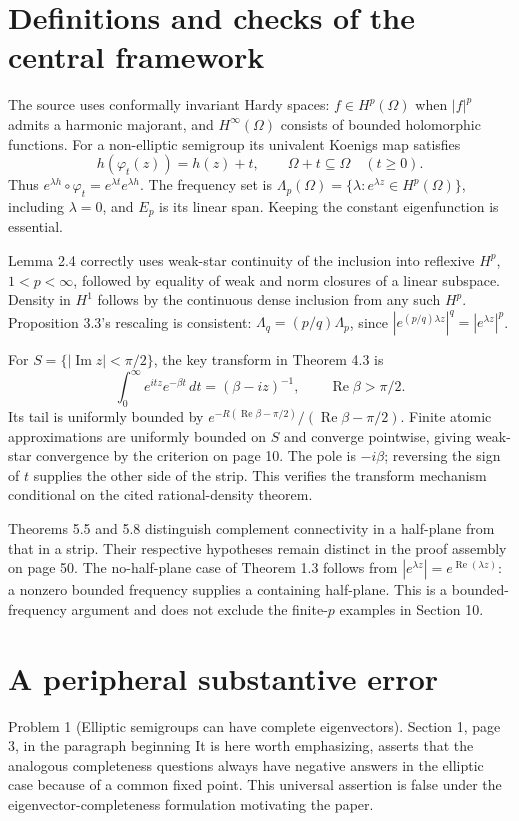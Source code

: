 \documentclass[10pt]{article}
\begin{document}
\section*{Definitions and checks of the central framework}
The source uses conformally invariant Hardy spaces: \(f\in H^p(\Omega)\) when \(|f|^p\) admits a harmonic majorant, and \(H^\infty(\Omega)\) consists of bounded holomorphic functions. For a non-elliptic semigroup its univalent Koenigs map satisfies \[h(\varphi_t(z))=h(z)+t,\qquad \Omega+t\subseteq\Omega\quad(t\geq0).\] Thus \(e^{\lambda h}\circ\varphi_t=e^{\lambda t}e^{\lambda h}\). The frequency set is \(\Lambda_p(\Omega)=\{\lambda:e^{\lambda z}\in H^p(\Omega)\}\), including \(\lambda=0\), and \(E_p\) is its linear span. Keeping the constant eigenfunction is essential.\par
Lemma 2.4 correctly uses weak-star continuity of the inclusion into reflexive \(H^p\), \(1<p<\infty\), followed by equality of weak and norm closures of a linear subspace. Density in \(H^1\) follows by the continuous dense inclusion from any such \(H^p\). Proposition 3.3’s rescaling is consistent: \(\Lambda_q=(p/q)\Lambda_p\), since \(|e^{(p/q)\lambda z}|^q=|e^{\lambda z}|^p\).\par
For \(S=\{|\operatorname{Im}z|<\pi/2\}\), the key transform in Theorem 4.3 is \[\int_0^\infty e^{itz}e^{-\beta t}\,dt=(\beta-iz)^{-1},
 \qquad \operatorname{Re}\beta>\pi/2.\] Its tail is uniformly bounded by \(e^{-R(\operatorname{Re}\beta-\pi/2)}/(\operatorname{Re}\beta-\pi/2)\). Finite atomic approximations are uniformly bounded on \(S\) and converge pointwise, giving weak-star convergence by the criterion on page 10. The pole is \(-i\beta\); reversing the sign of \(t\) supplies the other side of the strip. This verifies the transform mechanism conditional on the cited rational-density theorem.\par
Theorems 5.5 and 5.8 distinguish complement connectivity in a half-plane from that in a strip. Their respective hypotheses remain distinct in the proof assembly on page 50. The no-half-plane case of Theorem 1.3 follows from \(|e^{\lambda z}|=e^{\operatorname{Re}(\lambda z)}\): a nonzero bounded frequency supplies a containing half-plane. This is a bounded-frequency argument and does not exclude the finite-\(p\) examples in Section 10.\par
\section*{A peripheral substantive error}
Problem 1 (Elliptic semigroups can have complete eigenvectors).  Section 1, page 3, in the paragraph beginning It is here worth emphasizing, asserts that the analogous completeness questions always have negative answers in the elliptic case because of a common fixed point. This universal assertion is false under the eigenvector-completeness formulation motivating the paper.\par
\end{document}

